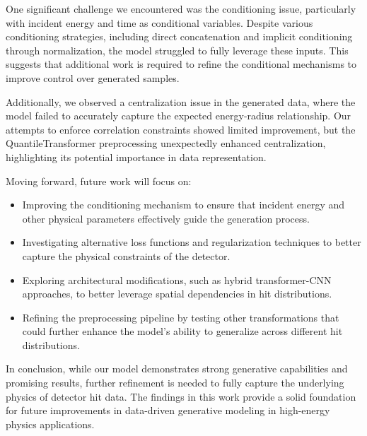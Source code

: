 One significant challenge we encountered was the conditioning issue, particularly with incident energy and time as conditional variables. Despite various conditioning strategies, including direct concatenation and implicit conditioning through normalization, the model struggled to fully leverage these inputs. This suggests that additional work is required to refine the conditional mechanisms to improve control over generated samples.

Additionally, we observed a centralization issue in the generated data, where the model failed to accurately capture the expected energy-radius relationship. Our attempts to enforce correlation constraints showed limited improvement, but the QuantileTransformer preprocessing unexpectedly enhanced centralization, highlighting its potential importance in data representation.

Moving forward, future work will focus on:
\begin{itemize}
    \item Improving the conditioning mechanism to ensure that incident energy and other physical parameters effectively guide the generation process.
    \item Investigating alternative loss functions and regularization techniques to better capture the physical constraints of the detector.
    \item Exploring architectural modifications, such as hybrid transformer-CNN approaches, to better leverage spatial dependencies in hit distributions.
    \item Refining the preprocessing pipeline by testing other transformations that could further enhance the model's ability to generalize across different hit distributions.
\end{itemize}

In conclusion, while our model demonstrates strong generative capabilities and promising results, further refinement is needed to fully capture the underlying physics of detector hit data. The findings in this work provide a solid foundation for future improvements in data-driven generative modeling in high-energy physics applications.




